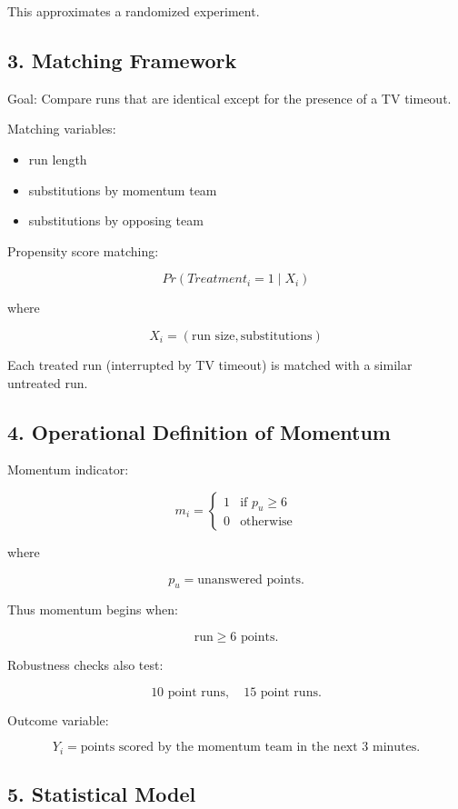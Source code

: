 \documentclass[11pt]{article}
\begin{document}
This approximates a randomized experiment.

\subsection*{3. Matching Framework}

Goal: Compare runs that are identical except for the presence of a TV timeout.

Matching variables:
\begin{itemize}
		\item run length
		\item substitutions by momentum team
		\item substitutions by opposing team
\end{itemize}

Propensity score matching:

\[
		Pr(Treatment_i = 1 \mid X_i)
\]

where

\[
		X_i = (\text{run size}, \text{substitutions})
\]

Each treated run (interrupted by TV timeout) is matched with a similar untreated run.

\subsection*{4. Operational Definition of Momentum}

Momentum indicator:

\[
		m_i =
		\begin{cases}
				1 & \text{if } p_u \ge 6 \\
				0 & \text{otherwise}
		\end{cases}
\]

where

\[
		p_u = \text{unanswered points}.
\]

Thus momentum begins when:

\[
		\text{run} \ge 6 \text{ points}.
\]

Robustness checks also test:

\[
		10 \text{ point runs}, \quad 15 \text{ point runs}.
\]

Outcome variable:

\[
		Y_i = \text{points scored by the momentum team in the next 3 minutes}.
\]

\subsection*{5. Statistical Model}
\end{document}
